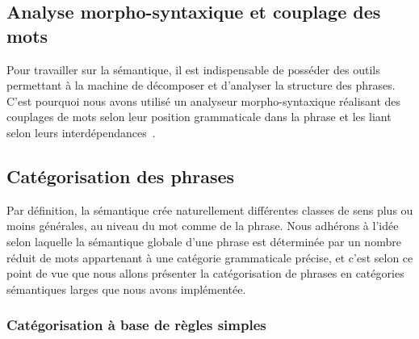 \documentclass[10pt,a4paper]{article}
\begin{document}
\subsection{Analyse morpho-syntaxique et couplage des mots}
\par Pour travailler sur la sémantique, il est indispensable de posséder des outils permettant à la machine de décomposer et d'analyser la structure des phrases. C'est pourquoi nous avons utilisé un analyseur morpho-syntaxique réalisant des couplages de mots selon leur position grammaticale dans la phrase et les liant selon leurs interdépendances~\cite{linkgrammar:paper}.

\subsection{Catégorisation des phrases}
\par Par définition, la sémantique crée naturellement différentes classes de sens plus ou moins générales, au niveau du mot comme de la phrase. Nous adhérons à l'idée selon laquelle la sémantique globale d'une phrase est déterminée par un nombre réduit de mots appartenant à une catégorie grammaticale précise, et c'est selon ce point de vue que nous allons présenter la catégorisation de phrases en catégories sémantiques larges que nous avons implémentée.
\subsubsection{Catégorisation à base de règles simples}
\end{document}
